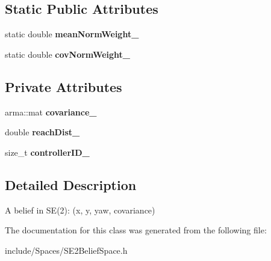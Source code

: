 \subsection*{\-Static \-Public \-Attributes}
\begin{DoxyCompactItemize}
\item 
\hypertarget{class_s_e2_belief_space_1_1_state_type_a4f0f638f62e339fd8cdcb43b3c49f2a6}{static double {\bfseries mean\-Norm\-Weight\-\_\-}}\label{class_s_e2_belief_space_1_1_state_type_a4f0f638f62e339fd8cdcb43b3c49f2a6}

\item 
\hypertarget{class_s_e2_belief_space_1_1_state_type_accb04f4d8d86cd9ba3626f2a96611fff}{static double {\bfseries cov\-Norm\-Weight\-\_\-}}\label{class_s_e2_belief_space_1_1_state_type_accb04f4d8d86cd9ba3626f2a96611fff}

\end{DoxyCompactItemize}
\subsection*{\-Private \-Attributes}
\begin{DoxyCompactItemize}
\item 
\hypertarget{class_s_e2_belief_space_1_1_state_type_a17d0cf7beb04a436d85a4a98344e8d49}{arma\-::mat {\bfseries covariance\-\_\-}}\label{class_s_e2_belief_space_1_1_state_type_a17d0cf7beb04a436d85a4a98344e8d49}

\item 
\hypertarget{class_s_e2_belief_space_1_1_state_type_a03b49bbd3c6dfe72df5fbb51482d9f54}{double {\bfseries reach\-Dist\-\_\-}}\label{class_s_e2_belief_space_1_1_state_type_a03b49bbd3c6dfe72df5fbb51482d9f54}

\item 
\hypertarget{class_s_e2_belief_space_1_1_state_type_a66c59e8db1686813bae0ea854afd9296}{size\-\_\-t {\bfseries controller\-I\-D\-\_\-}}\label{class_s_e2_belief_space_1_1_state_type_a66c59e8db1686813bae0ea854afd9296}

\end{DoxyCompactItemize}


\subsection{\-Detailed \-Description}
\-A belief in \-S\-E(2)\-: (x, y, yaw, covariance) 

\-The documentation for this class was generated from the following file\-:\begin{DoxyCompactItemize}
\item 
include/\-Spaces/\-S\-E2\-Belief\-Space.\-h\end{DoxyCompactItemize}
